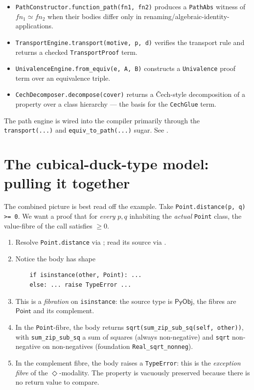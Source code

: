 \begin{itemize}[leftmargin=1.7em]
  \item \texttt{PathConstructor.function\_path(fn1, fn2)} produces a
    \texttt{PathAbs} witness of $fn_1 \simeq fn_2$ when their bodies
    differ only in renaming/algebraic-identity-applications.
  \item \texttt{TransportEngine.transport(motive, p, d)} verifies the
    transport rule and returns a checked \texttt{TransportProof}
    term.
  \item \texttt{UnivalenceEngine.from\_equiv(e, A, B)} constructs a
    \texttt{Univalence} proof term over an equivalence triple.
  \item \texttt{CechDecomposer.decompose(cover)} returns a Čech-style
    decomposition of a property over a class hierarchy --- the basis
    for the \texttt{CechGlue} term.
\end{itemize}

The path engine is wired into the \PSDL{} compiler primarily through
the \texttt{transport(...)} and \texttt{equiv\_to\_path(...)} sugar.
See .

\section{The cubical-duck-type model: pulling it together}
\label{sec:ddtm-pulling-together}

The combined picture is best read off the example.  Take
\texttt{Point.distance(p, q) >= 0}.  We want a proof that for
\emph{every} $p, q$ inhabiting the \emph{actual} \Sympy{}
\texttt{Point} class, the value-fibre of the call satisfies $\ge 0$.

\begin{enumerate}[leftmargin=1.7em]
  \item Resolve \verb|Point.distance| via \Importlib; read its source
    via \Inspect.
  \item Notice the body has shape
    \begin{verbatim}
    if isinstance(other, Point): ...
    else: ... raise TypeError ...
    \end{verbatim}
  \item This is a \emph{fibration} on \texttt{isinstance}: the source
    type is $\mathsf{PyObj}$, the fibres are $\mathsf{Point}$ and
    its complement.
  \item In the \texttt{Point}-fibre, the body returns
    \texttt{sqrt(sum\_zip\_sub\_sq(self, other))}, with
    \texttt{sum\_zip\_sub\_sq} a sum of squares (always non-negative)
    and \texttt{sqrt} non-negative on non-negatives (foundation
    \texttt{Real\_sqrt\_nonneg}).
  \item In the complement fibre, the body raises a
    \texttt{TypeError}: this is the \emph{exception fibre} of the
    $\Diamond$-modality.  The property is vacuously preserved
    because there is no return value to compare.
\end{enumerate}

